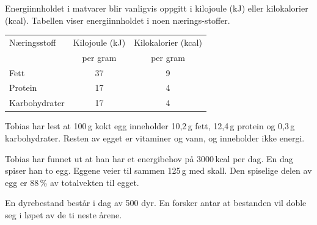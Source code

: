 Energiinnholdet i matvarer blir vanligvis oppgitt i kilojoule (kJ) eller
kilokalorier (kcal). Tabellen viser energiinnholdet i noen nærings-stoffer.

\begin{center}
	\begin{tabular}{l c c }
		\hline
		Næringsstoff & Kilojoule (kJ) & Kilokalorier (kcal) \\
		& per gram  & per gram \\
		\hline
		Fett          & 37 & 9 \\
		Protein       & 17 & 4 \\
		Karbohydrater & 17 & 4 \\
		\hline
	\end{tabular}
\end{center}

Tobias har lest at 100\,g kokt egg inneholder 10,2\,g fett, 12,4\,g protein
og 0,3\,g karbohydrater. Resten av egget er vitaminer og vann, og inneholder
ikke energi.


Tobias har funnet ut at han har et energibehov på 3000\,kcal per dag.
En dag spiser han to egg. Eggene veier til sammen 125\,g med skall.
Den spiselige delen av egg er 88\,\% av totalvekten til egget.

\newpage
{}
En dyrebestand består i dag av 500 dyr. En forsker antar at bestanden vil
doble seg i løpet av de ti neste årene.

